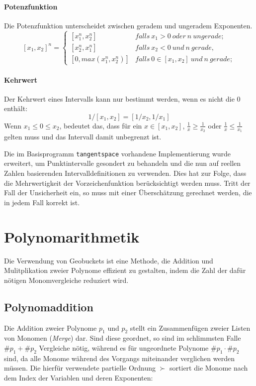 \paragraph{Potenzfunktion}\label{par:potenzfunktion}
Die Potenzfunktion unterscheidet zwischen geradem und ungeradem Exponenten.
$$[x_1, x_2]^n =
 \begin{cases}
    [x_1^n, x_2^n] & falls\ x_1 > 0\ oder\ n\ ungerade; \\
    [x_2^n, x_1^n] & falls\ x_2 < 0\ und\ n\ gerade, \\
    [0, max(x_1^n, x_2^n)] & falls\ 0\in [x_1, x_2] \ und\ n\ gerade;
 \end{cases}$$

\paragraph{Kehrwert}
Der Kehrwert eines Intervalls kann nur bestimmt werden, wenn es nicht die 0 enthält:
$$
1/[x_1, x_2] = [1/x_2, 1/x_1]
$$
Wenn $x_1 \leq 0\leq x_2$, bedeutet das, dass für ein $x\in [x_1, x_2]$, $\frac{1}{x} \geq \frac{1}{x_2}$ oder $\frac{1}{x} \leq \frac{1}{x_1}$ gelten muss und das Intervall damit unbegrenzt ist.


Die im Basisprogramm \verb+tangentspace+ vorhandene Implementierung wurde erweitert, um Punktintervalle gesondert zu behandeln und die nun auf reellen Zahlen basierenden Intervalldefinitionen zu verwenden. Dies hat zur Folge, dass die Mehrwertigkeit der Vorzeichenfunktion berücksichtigt werden muss. Tritt der Fall der Unsicherheit ein, so muss mit einer Überschätzung gerechnet werden, die in jedem Fall korrekt ist.




\section{Polynomarithmetik}
\label{ch:Implementierung:sec:Abschnitt1}

Die Verwendung von Geobuckets ist eine Methode, die Addition \cite{geobuckets} und Mulitplikation \cite{geobucketsmulti} zweier Polynome effizient zu gestalten, indem die Zahl der dafür nötigen Monomvergleiche reduziert wird.

\subsection{Polynomaddition}
Die Addition zweier Polynome $p_1$ und $p_2$ stellt ein Zusammenfügen zweier Listen von Monomen (\textit{Merge}) dar. Sind diese geordnet, so sind im schlimmsten Falle $\#p_1 +\#p_2$ Vergleiche nötig, während es für ungeordnete Polynome $\#p_1 \cdot \#p_2$ sind, da alle Monome während des Vorgangs miteinander verglichen werden müssen. Die hierfür verwendete partielle Ordnung $\succ$ sortiert die Monome nach dem Index der Variablen und deren Exponenten:

